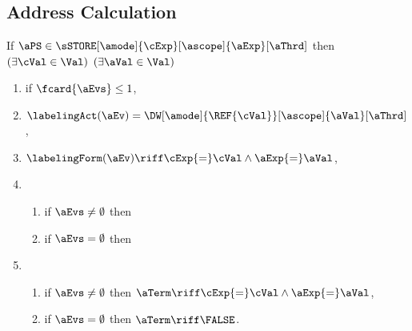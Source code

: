 \subsection{Address Calculation}
\label{sec:semaddr}
\begin{definition}
  \label{def:semaddr}

  \noindent
  If $\aPS \in \sSTORE[\amode]{\cExp}[\ascope]{\aExp}[\aThrd]$ then
  $(\exists\cVal\in\Val)$
  $(\exists\aVal\in\Val)$
  \begin{multicols}{2}
    \begin{enumerate}[topsep=0pt,label=(\textsc{w}\arabic*),ref=\textsc{w}\arabic*]
    \item \label{write-E-addr}
      if $\fcard{\aEvs}\leq1$,
    \item \label{write-lambda-addr}
      $\labelingAct(\aEv) = \DW[\amode]{\REF{\cVal}}[\ascope]{\aVal}[\aThrd]$,
    \item \label{write-kappa-addr}
      \begin{math}
        \labelingForm(\aEv) \riff
        \cExp{=}\cVal
        \land \aExp{=}\aVal
      \end{math},      
    \item[] 
      \begin{enumerate}[leftmargin=0pt]
      \item \label{write-tau-dep-addr}
        if $\aEvs\neq\emptyset$ then 
        \makebox[0pt][l]{\begin{math}
          \aTr{\bEvs}{\bForm} \riff 
          (\cExp{=}\cVal)
          \limplies 
          \bForm[\aExp/\REF{\cVal}][\aExp{=}\aVal/\Q{\REF{\cVal}}]
        \end{math},}
      \item \label{write-tau-empty-addr}
        if $\aEvs=\emptyset$ then
        \makebox[0pt][l]{\begin{math}
          (\forall\dVal)
        \end{math}        
        \begin{math}
          \aTr{\bEvs}{\bForm} \riff 
          (\cExp{=}\dVal)
          \limplies 
          \bForm
          [\aExp/\REF{\dVal}][\FALSE/\Q{\REF{\dVal}}],
        \end{math}}
      \end{enumerate}
      \columnbreak
    \item[] 
      \begin{enumerate}[leftmargin=0pt]
      \item \label{write-term-nonempty-addr}
        if $\aEvs\neq\emptyset$ then $\aTerm \riff \cExp{=}\cVal \land \aExp{=}\aVal$,
      \item \label{write-term-empty-addr}
        if $\aEvs=\emptyset$ then $\aTerm \riff \FALSE$.
      \end{enumerate}
    \end{enumerate}
  \end{multicols}


\end{definition}
